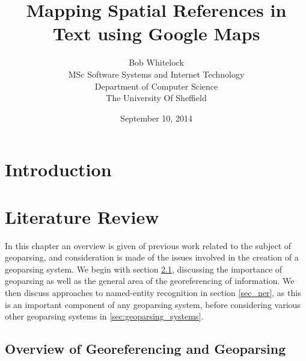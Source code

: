 \documentclass[12pt, a4paper]{report}
\title{Mapping Spatial References in Text using Google Maps}
\date{September 10, 2014}
\author{Bob Whitelock\\ MSc Software Systems and Internet Technology\\ Department of Computer Science\\ The University Of Sheffield}
\begin{document}
\maketitle

\begin{abstract}

\end{abstract}

\tableofcontents

\glsaddall
\printglossaries

\chapter{Introduction}








\chapter{Literature Review}

In this chapter an overview is given of previous work related to the subject of geoparsing, and consideration is made of the issues involved in the creation of a geoparsing system. We begin with section \ref{sec:overview_georeferencing}, discussing the importance of geoparsing as well as the general area of the georeferencing of information. We then discuss approaches to named-entity recognition in section \ref{sec_ner}, as this is an important component of any geoparsing system, before considering various other geoparsing systems in \ref{sec:geoparsing_systems}.


\section{Overview of Georeferencing and Geoparsing}
\label{sec:overview_georeferencing}
\end{document}
